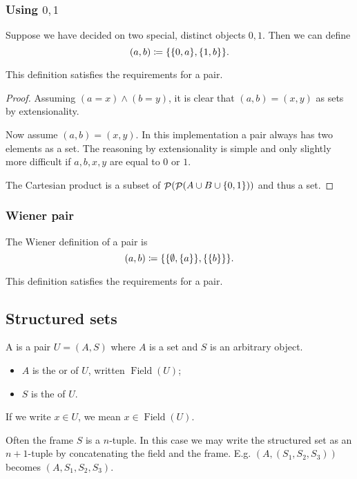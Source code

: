 \subsubsection{Using $0,1$}
Suppose we have decided on two special, distinct objects $0,1$. Then we can define
\[ (a,b) \coloneqq \{\{0,a\},\{1,b\}\}. \]
\begin{proposition}
This definition satisfies the requirements for a pair.
\end{proposition}
\begin{proof}
Assuming $(a=x)\land (b=y)$, it is clear that $(a,b)=(x,y)$ as sets by extensionality.

Now assume $(a,b)=(x,y)$. In this implementation a pair always has two elements as a set. The reasoning by extensionality is simple and only slightly more difficult if $a,b,x,y$ are equal to $0$ or $1$.

The Cartesian product is a subset of $\mathop{\mathcal{P}}(\mathop{\mathcal{P}}(A\cup B\cup \{0,1\}))$ and thus a set.
\end{proof}
\subsubsection{Wiener pair}
The Wiener definition of a pair is
\[ (a,b) \coloneqq \{\{\emptyset,\{a\}\},\{\{b\}\}\}. \]
\begin{proposition}
This definition satisfies the requirements for a pair.
\end{proposition}

\subsection{Structured sets}
\begin{definition}
A  is a pair $U = (A,S)$ where $A$ is a set and $S$ is an arbitrary object.
\begin{itemize}
\item $A$ is the  or  of $U$, written $\operatorname{Field}(U)$;
\item $S$ is the  of $U$.
\end{itemize}
If we write $x\in U$, we mean $x\in \operatorname{Field}(U)$.
\end{definition}

Often the frame $S$ is a $n$-tuple. In this case we may write the structured set as an $n+1$-tuple by concatenating the field and the frame. E.g. $(A,(S_1,S_2,S_3))$ becomes $(A,S_1,S_2,S_3)$.

